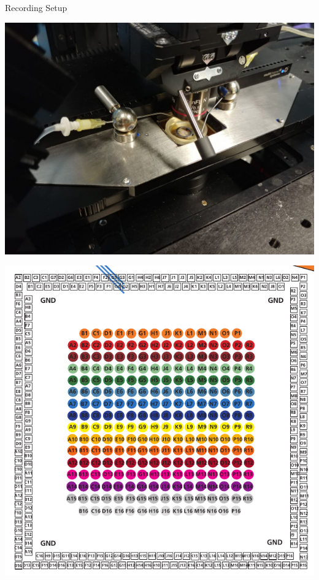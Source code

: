 \documentclass[10pt]{beamer}
\begin{document}
\begin{frame}[allowframebreaks]{Recording Setup}
 \framebreak
 \begin{center}
    \includegraphics[keepaspectratio,width=0.8\framewidth]{img/1_setup_close.jpg}
 \end{center}
  \framebreak
 \begin{center}
  \includegraphics[keepaspectratio,width=0.6\framewidth]{img/1_setup_mea_layout.png}
   \end{center}
  \framebreak
 \begin{center}

\end{center}
\end{frame}
\end{document}
